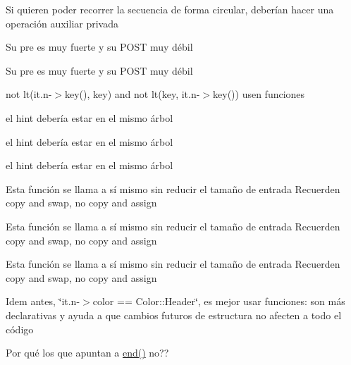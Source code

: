 \begin{DoxyRefList}
Si quieren poder recorrer la secuencia de forma circular, deberían hacer una operación auxiliar privada 
\item[\label{deprecated__deprecated000024}%
\hypertarget{deprecated__deprecated000024}{}%
Miembro \hyperlink{classaed2_1_1map_1_1iterator_ad052c1ef8477a1613c292202226053a5_ad052c1ef8477a1613c292202226053a5}{aed2\+:\+:map$<$ Key, Meaning, Compare $>$\+:\+:iterator\+:\+:operator==} (iterator other) const ]Su pre es muy fuerte y su P\+O\+ST muy débil

Su pre es muy fuerte y su P\+O\+ST muy débil 
\item[\label{deprecated__deprecated000011}%
\hypertarget{deprecated__deprecated000011}{}%
Miembro \hyperlink{classaed2_1_1map_a3399d36fdd5a880b494f3a5795d3f18f_a3399d36fdd5a880b494f3a5795d3f18f}{aed2\+:\+:map$<$ Key, Meaning, Compare $>$\+:\+:lower\+\_\+bound} (const Key \&key) const ]not lt(it.\+n-\/$>$key(), key) and not lt(key, it.\+n-\/$>$key()) usen funciones 
\item[\label{deprecated__deprecated000003}%
\hypertarget{deprecated__deprecated000003}{}%
Miembro \hyperlink{classaed2_1_1map_a7a77950a3d8e637bfa7cf5dcd904f257_a7a77950a3d8e637bfa7cf5dcd904f257}{aed2\+:\+:map$<$ Key, Meaning, Compare $>$\+:\+:map} (const map \&other)]el hint debería estar en el mismo árbol

el hint debería estar en el mismo árbol

el hint debería estar en el mismo árbol 
\item[\label{deprecated__deprecated000004}%
\hypertarget{deprecated__deprecated000004}{}%
Miembro \hyperlink{classaed2_1_1map_ac606d334809066929522964d45e76317_ac606d334809066929522964d45e76317}{aed2\+:\+:map$<$ Key, Meaning, Compare $>$\+:\+:operator=} (map other)]Esta función se llama a sí mismo sin reducir el tamaño de entrada Recuerden copy and swap, no copy and assign

Esta función se llama a sí mismo sin reducir el tamaño de entrada Recuerden copy and swap, no copy and assign

Esta función se llama a sí mismo sin reducir el tamaño de entrada Recuerden copy and swap, no copy and assign 
\item[\label{deprecated__deprecated000007}%
\hypertarget{deprecated__deprecated000007}{}%
Miembro \hyperlink{classaed2_1_1map_a96f23896164ab47bee48c26b803f9801_a96f23896164ab47bee48c26b803f9801}{aed2\+:\+:map$<$ Key, Meaning, Compare $>$\+:\+:operator\mbox{[}\mbox{]}} (const Key \&key)]Idem antes, \char`\"{}it.\+n-\/$>$color == Color\+::\+Header\char`\"{}, es mejor usar funciones\+: son más declarativas y ayuda a que cambios futuros de estructura no afecten a todo el código 
\item[\label{deprecated__deprecated000005}%
\hypertarget{deprecated__deprecated000005}{}%
Miembro \hyperlink{classaed2_1_1map_ab22c9a85c2dadbc286cd30e97069a8e6_ab22c9a85c2dadbc286cd30e97069a8e6}{aed2\+:\+:map$<$ Key, Meaning, Compare $>$\+:\+:$\sim$map} ()]Por qué los que apuntan a \hyperlink{classaed2_1_1map_a76023e6a56cb625513e1b5ea028bf983_a76023e6a56cb625513e1b5ea028bf983}{end()} no??


\end{DoxyRefList}
